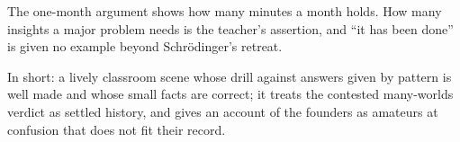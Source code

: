 \begin{afterword}
The one-month argument shows how many minutes a month holds. How many insights a major problem needs is the teacher's assertion, and ``it has been done'' is given no example beyond Schrödinger's retreat.

In short: a lively classroom scene whose drill against answers given by pattern is well made and whose small facts are correct; it treats the contested many-worlds verdict as settled history, and gives an account of the founders as amateurs at confusion that does not fit their record.
\end{afterword}
